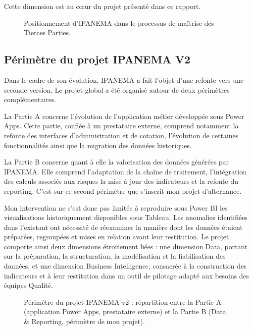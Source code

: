 Cette dimension est au cœur du projet présenté dans ce rapport. 

\begin{figure}[H]
    \centering
    \caption{Positionnement d’IPANEMA dans le processus de maîtrise des Tierces Parties.}
    \label{fig:processusde_maîtrise_des_Tierces}
\end{figure}


\subsection{ Périmètre du projet IPANEMA V2  }\label{subsec:Perimètre du projet IPANEMA V2} 

Dans le cadre de son évolution, IPANEMA a fait l’objet d’une refonte vers une seconde 
version. Le projet global a été organisé autour de deux périmètres complémentaires. 

La Partie A concerne l’évolution de l’application métier développée sous Power Apps. 
Cette partie, confiée à un prestataire externe, comprend notamment la refonte des interfaces 
d’administration et de cotation, l’évolution de certaines fonctionnalités ainsi que la migration 
des données historiques. 

La Partie B concerne quant à elle la valorisation des données générées par IPANEMA. 
Elle comprend l’adaptation de la chaîne de traitement, l’intégration des calculs associés aux 
risques la mise à jour des indicateurs et la refonte du reporting. C’est sur ce second périmètre 
que s’inscrit mon projet d’alternance. 

Mon intervention ne s'est donc pas limitée à reproduire sous Power BI les visualisations 
historiquement disponibles sous Tableau. Les anomalies identifiées dans l'existant ont 
nécessité de réexaminer la manière dont les données étaient préparées, regroupées et mises 
en relation avant leur restitution. Le projet comporte ainsi deux dimensions étroitement liées : 
une dimension Data, portant sur la préparation, la structuration, la modélisation et la 
fiabilisation des données, et une dimension Business Intelligence, consacrée à la construction 
des indicateurs et à leur restitution dans un outil de pilotage adapté aux besoins des équipes 
Qualité. 

\begin{figure}[H]
    \centering
    \caption{Périmètre du projet IPANEMA v2 : répartition entre la Partie A (application Power Apps, prestataire externe) et la Partie B (Data \& Reporting, périmètre de mon projet).}
    \label{fig:Perimètre_du_projet_IPANEMA_v2}
\end{figure}


